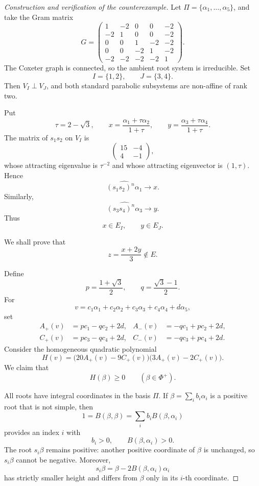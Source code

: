 \documentclass[11pt,reqno]{amsart}
\theoremstyle{plain}
\theoremstyle{definition}
\theoremstyle{remark}
\numberwithin{equation}{section}
\begin{document}
\begin{proof}[Construction and verification of the counterexample]
Let $\Pi=\{\alpha_1,\ldots,\alpha_5\}$, and take the Gram matrix
\[
G=
\begin{pmatrix}
1&-2&0&0&-2\\
-2&1&0&0&-2\\
0&0&1&-2&-2\\
0&0&-2&1&-2\\
-2&-2&-2&-2&1
\end{pmatrix}.
\]
The Coxeter graph is connected, so the ambient root system is
irreducible. Set
\[
I=\{1,2\},\qquad J=\{3,4\}.
\]
Then $V_I\perp V_J$, and both standard parabolic subsystems are
non-affine of rank two.

Put
\[
\tau=2-\sqrt3,
\qquad
x=\frac{\alpha_1+\tau\alpha_2}{1+\tau},
\qquad
y=\frac{\alpha_3+\tau\alpha_4}{1+\tau}.
\]
The matrix of $s_1s_2$ on $V_I$ is
\[
\begin{pmatrix}
15&-4\\
4&-1
\end{pmatrix},
\]
whose attracting eigenvalue is $\tau^{-2}$ and whose attracting
eigenvector is $(1,\tau)$. Hence
\[
\widehat{(s_1s_2)^n\alpha_1}\longrightarrow x.
\]
Similarly,
\[
\widehat{(s_3s_4)^n\alpha_3}\longrightarrow y.
\]
Thus
\[
x\in E_I,\qquad y\in E_J.
\]

We shall prove that
\[
z=\frac{x+2y}{3}\notin E.
\]

Define
\[
p=\frac{1+\sqrt3}{2},
\qquad
q=\frac{\sqrt3-1}{2}.
\]
For
\[
v=c_1\alpha_1+c_2\alpha_2+c_3\alpha_3+c_4\alpha_4+d\alpha_5,
\]
set
\[
\begin{aligned}
A_+(v)&=pc_1-qc_2+2d,
&
A_-(v)&=-qc_1+pc_2+2d,\\
C_+(v)&=pc_3-qc_4+2d,
&
C_-(v)&=-qc_3+pc_4+2d.
\end{aligned}
\]
Consider the homogeneous quadratic polynomial
\[
H(v)
=
\bigl(20A_+(v)-9C_+(v)\bigr)
\bigl(3A_+(v)-2C_+(v)\bigr).
\]
We claim that
\[
H(\beta)\ge0
\qquad(\beta\in\Phi^+).
\]

All roots have integral coordinates in the basis $\Pi$.
If $\beta=\sum_i b_i\alpha_i$ is a positive root that is not
simple, then
\[
1=B(\beta,\beta)=\sum_i b_iB(\beta,\alpha_i)
\]
provides an index $i$ with
\[
b_i>0,\qquad B(\beta,\alpha_i)>0.
\]
The root $s_i\beta$ remains positive: another positive coordinate
of $\beta$ is unchanged, so $s_i\beta$ cannot be negative.
Moreover,
\[
s_i\beta=\beta-2B(\beta,\alpha_i)\alpha_i
\]
has strictly smaller height and differs from $\beta$ only in its
$i$-th coordinate.


\end{proof}
\end{document}
